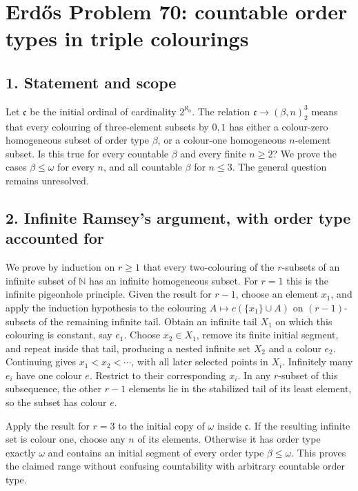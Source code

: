 \section*{Erd\H{o}s Problem 70: countable order types in triple colourings}
\subsection*{1. Statement and scope}
Let $\mathfrak c$ be the initial ordinal of cardinality $2^{\aleph_0}$. The relation $\mathfrak c\to(\beta,n)^3_2$ means that every colouring of three-element subsets by $0,1$ has either a colour-zero homogeneous subset of order type $\beta$, or a colour-one homogeneous $n$-element subset. Is this true for every countable $\beta$ and every finite $n\ge2$? We prove the cases $\beta\le\omega$ for every $n$, and all countable $\beta$ for $n\le3$. The general question remains unresolved.

\subsection*{2. Infinite Ramsey's argument, with order type accounted for}
We prove by induction on $r\ge1$ that every two-colouring of the $r$-subsets of an infinite subset of $\mathbb N$ has an infinite homogeneous subset. For $r=1$ this is the infinite pigeonhole principle. Given the result for $r-1$, choose an element $x_1$, and apply the induction hypothesis to the colouring $A\mapsto c(\{x_1\}\cup A)$ on $(r-1)$-subsets of the remaining infinite tail. Obtain an infinite tail $X_1$ on which this colouring is constant, say $e_1$.
Choose $x_2\in X_1$, remove its finite initial segment, and repeat inside that tail, producing a nested infinite set $X_2$ and a colour $e_2$. Continuing gives $x_1<x_2<\cdots$, with all later selected points in $X_i$. Infinitely many $e_i$ have one colour $e$. Restrict to their corresponding $x_i$. In any $r$-subset of this subsequence, the other $r-1$ elements lie in the stabilized tail of its least element, so the subset has colour $e$.

Apply the result for $r=3$ to the initial copy of $\omega$ inside $\mathfrak c$. If the resulting infinite set is colour one, choose any $n$ of its elements. Otherwise it has order type exactly $\omega$ and contains an initial segment of every order type $\beta\le\omega$. This proves the claimed range without confusing countability with arbitrary countable order type.


